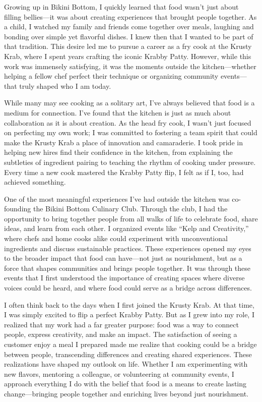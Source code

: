 
Growing up in Bikini Bottom, I quickly learned that food wasn't just about filling bellies---it was about creating experiences that brought people together. As a child, I watched my family and friends come together over meals, laughing and bonding over simple yet flavorful dishes. I knew then that I wanted to be part of that tradition. This desire led me to pursue a career as a fry cook at the Krusty Krab, where I spent years crafting the iconic Krabby Patty. However, while this work was immensely satisfying, it was the moments outside the kitchen---whether helping a fellow chef perfect their technique or organizing community events---that truly shaped who I am today.

While many may see cooking as a solitary art, I've always believed that food is a medium for connection. I've found that the kitchen is just as much about collaboration as it is about creation. As the head fry cook, I wasn't just focused on perfecting my own work; I was committed to fostering a team spirit that could make the Krusty Krab a place of innovation and camaraderie. I took pride in helping new hires find their confidence in the kitchen, from explaining the subtleties of ingredient pairing to teaching the rhythm of cooking under pressure. Every time a new cook mastered the Krabby Patty flip, I felt as if I, too, had achieved something.

One of the most meaningful experiences I've had outside the kitchen was co-founding the Bikini Bottom Culinary Club. Through the club, I had the opportunity to bring together people from all walks of life to celebrate food, share ideas, and learn from each other. I organized events like “Kelp and Creativity,” where chefs and home cooks alike could experiment with unconventional ingredients and discuss sustainable practices. These experiences opened my eyes to the broader impact that food can have---not just as nourishment, but as a force that shapes communities and brings people together. It was through these events that I first understood the importance of creating spaces where diverse voices could be heard, and where food could serve as a bridge across differences.

I often think back to the days when I first joined the Krusty Krab. At that time, I was simply excited to flip a perfect Krabby Patty. But as I grew into my role, I realized that my work had a far greater purpose: food was a way to connect people, express creativity, and make an impact. The satisfaction of seeing a customer enjoy a meal I prepared made me realize that cooking could be a bridge between people, transcending differences and creating shared experiences. These realizations have shaped my outlook on life. Whether I am experimenting with new flavors, mentoring a colleague, or volunteering at community events, I approach everything I do with the belief that food is a means to create lasting change---bringing people together and enriching lives beyond just nourishment.
